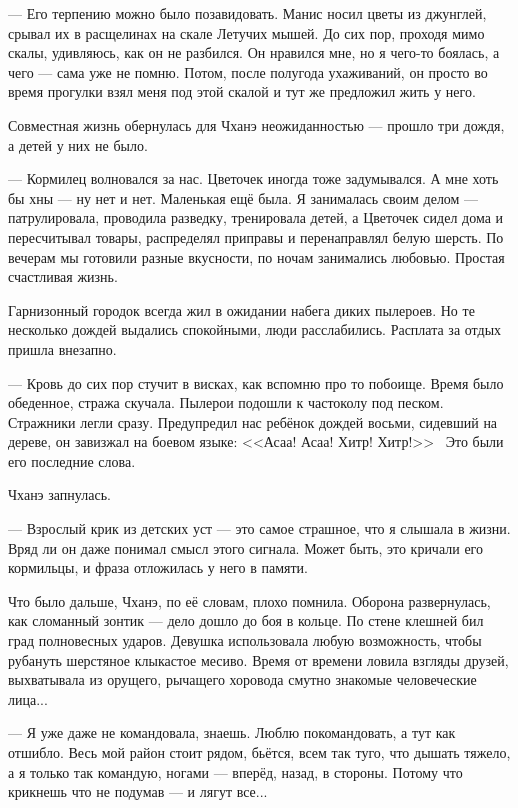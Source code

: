 --- Его терпению можно было позавидовать.
Манис носил цветы из джунглей, срывал их в расщелинах на скале Летучих мышей.
До сих пор, проходя мимо скалы, удивляюсь, как он не разбился.
Он нравился мне, но я чего-то боялась, а чего --- сама уже не помню.
Потом, после полугода ухаживаний, он просто во время прогулки взял меня под этой скалой и тут же предложил жить у него.

Совместная жизнь обернулась для Чханэ неожиданностью --- прошло три дождя, а детей у них не было.

--- Кормилец волновался за нас.
Цветочек иногда тоже задумывался.
А мне хоть бы хны --- ну нет и нет.
Маленькая ещё была.
Я занималась своим делом --- патрулировала, проводила разведку, тренировала детей, а Цветочек сидел дома и пересчитывал товары, распределял приправы и перенаправлял белую шерсть.
По вечерам мы готовили разные вкусности, по ночам занимались любовью.
Простая счастливая жизнь.

Гарнизонный городок всегда жил в ожидании набега диких пылероев.
Но те несколько дождей выдались спокойными, люди расслабились.
Расплата за отдых пришла внезапно.

--- Кровь до сих пор стучит в висках, как вспомню про то побоище.
Время было обеденное, стража скучала.
Пылерои подошли к частоколу под песком.
Стражники легли сразу.
Предупредил нас ребёнок дождей восьми, сидевший на дереве, он завизжал на боевом языке: <<Асаа! Асаа! Хитр! Хитр!>>\FM\
Это были его последние слова.

Чханэ запнулась.

--- Взрослый крик из детских уст --- это самое страшное, что я слышала в жизни.
Вряд ли он даже понимал смысл этого сигнала.
Может быть, это кричали его кормильцы, и фраза отложилась у него в памяти.

Что было дальше, Чханэ, по её словам, плохо помнила.
Оборона развернулась, как сломанный зонтик --- дело дошло до боя в кольце.
По стене клешней бил град полновесных ударов.
Девушка использовала любую возможность, чтобы рубануть шерстяное клыкастое месиво.
Время от времени ловила взгляды друзей, выхватывала из орущего, рычащего хоровода смутно знакомые человеческие лица...

--- Я уже даже не командовала, знаешь.
Люблю покомандовать, а тут как отшибло.
Весь мой район стоит рядом, бьётся, всем так туго, что дышать тяжело, а я только так командую, ногами --- вперёд, назад, в стороны.
Потому что крикнешь что не подумав --- и лягут все...

